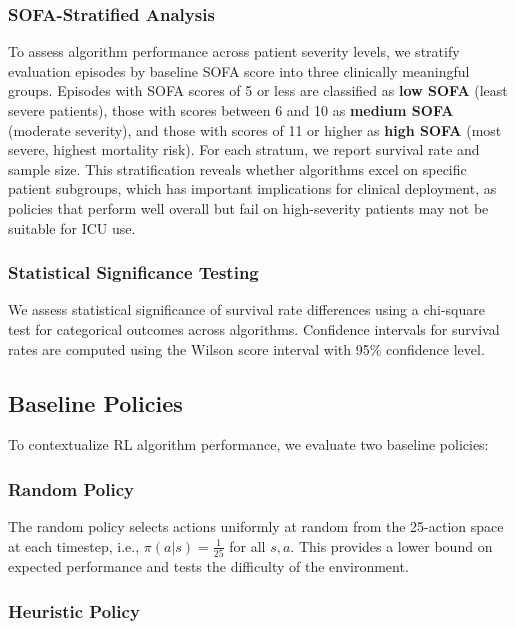 \subsubsection{SOFA-Stratified Analysis}

To assess algorithm performance across patient severity levels, we stratify evaluation episodes by baseline SOFA score into three clinically meaningful groups. Episodes with SOFA scores of 5 or less are classified as \textbf{low SOFA} (least severe patients), those with scores between 6 and 10 as \textbf{medium SOFA} (moderate severity), and those with scores of 11 or higher as \textbf{high SOFA} (most severe, highest mortality risk). For each stratum, we report survival rate and sample size. This stratification reveals whether algorithms excel on specific patient subgroups, which has important implications for clinical deployment, as policies that perform well overall but fail on high-severity patients may not be suitable for ICU use.

\subsubsection{Statistical Significance Testing}

We assess statistical significance of survival rate differences using a chi-square test for categorical outcomes across algorithms. Confidence intervals for survival rates are computed using the Wilson score interval with 95\% confidence level.

\subsection{Baseline Policies}\label{sec:methods:baselines}

To contextualize RL algorithm performance, we evaluate two baseline policies:

\subsubsection{Random Policy}

The random policy selects actions uniformly at random from the 25-action space at each timestep, i.e., $\pi(a|s) = \frac{1}{25}$ for all $s, a$. This provides a lower bound on expected performance and tests the difficulty of the environment.

\subsubsection{Heuristic Policy}


